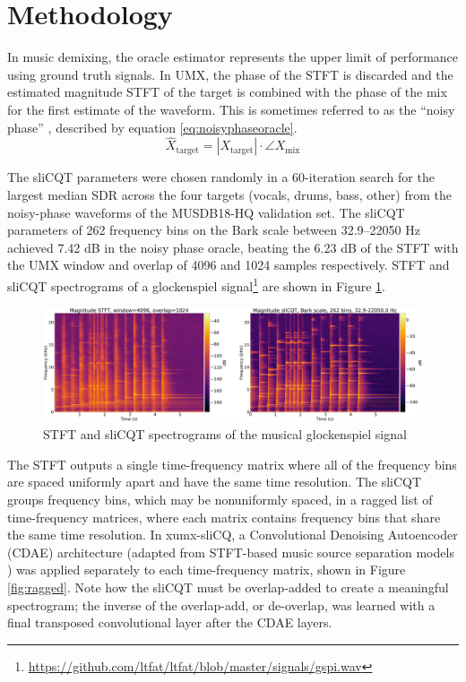 \documentclass{article}
\begin{document}
\section{Methodology}
\label{sec:method}

In music demixing, the oracle estimator represents the upper limit of performance using ground truth signals. In UMX, the phase of the STFT is discarded and the estimated magnitude STFT of the target is combined with the phase of the mix for the first estimate of the waveform. This is sometimes referred to as the ``noisy phase'' \cite{noisyphase1}, described by equation \eqref{eq:noisyphaseoracle}.
\begin{equation}\label{eq:noisyphaseoracle}
\hat{X}_{\text{target}} = |X_{\text{target}}| \cdot \angle{X_{\text{mix}}}
\end{equation}

The sliCQT parameters were chosen randomly in a 60-iteration search for the largest median SDR across the four targets (vocals, drums, bass, other) from the noisy-phase waveforms of the MUSDB18-HQ \cite{musdb18hq} validation set. The sliCQT parameters of 262 frequency bins on the Bark scale between 32.9--22050 Hz achieved 7.42 dB in the noisy phase oracle, beating the 6.23 dB of the STFT with the UMX window and overlap of 4096 and 1024 samples respectively. STFT and sliCQT spectrograms of a glockenspiel signal\footnote{\url{https://github.com/ltfat/ltfat/blob/master/signals/gspi.wav}} are shown in Figure \ref{fig:spectrograms}.

\begin{figure}[h]
	\includegraphics[width=\textwidth]{./spectrograms_comparison.png}
	\caption{STFT and sliCQT spectrograms of the musical glockenspiel signal}
	\label{fig:spectrograms}
\end{figure}

The STFT outputs a single time-frequency matrix where all of the frequency bins are spaced uniformly apart and have the same time resolution. The sliCQT groups frequency bins, which may be nonuniformly spaced, in a ragged list of time-frequency matrices, where each matrix contains frequency bins that share the same time resolution. In xumx-sliCQ, a Convolutional Denoising Autoencoder (CDAE) architecture (adapted from STFT-based music source separation models \cite{plumbley1, plumbley2}) was applied separately to each time-frequency matrix, shown in Figure \ref{fig:ragged}. Note how the sliCQT must be overlap-added to create a meaningful spectrogram; the inverse of the overlap-add, or de-overlap, was learned with a final transposed convolutional layer after the CDAE layers.
\end{document}

